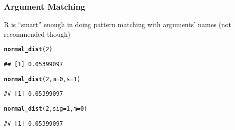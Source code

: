 \documentclass[12pt]{beamer}\usepackage[]{graphicx}\usepackage[]{color}
\makeatletter
\newcommand{\hlnum}[1]{\textcolor[rgb]{0.686,0.059,0.569}{#1}}%
\newcommand{\hlstd}[1]{\textcolor[rgb]{0.345,0.345,0.345}{#1}}%
\newcommand{\hlkwc}[1]{\textcolor[rgb]{0.333,0.667,0.333}{#1}}%
\newcommand{\hlkwd}[1]{\textcolor[rgb]{0.737,0.353,0.396}{\textbf{#1}}}%
\newenvironment{kframe}{%
 \def\at@end@of@kframe{}%
 \ifinner\ifhmode%
  \def\at@end@of@kframe{\end{minipage}}%
  \begin{minipage}{\columnwidth}%
 \fi\fi%
 \def\FrameCommand##1{\hskip\@totalleftmargin \hskip-\fboxsep
 \colorbox{shadecolor}{##1}\hskip-\fboxsep
     \hskip-\linewidth \hskip-\@totalleftmargin \hskip\columnwidth}%
 \MakeFramed {\advance\hsize-\width
   \@totalleftmargin\z@ \linewidth\hsize
   \@setminipage}}%
 {\par\unskip\endMakeFramed%
 \at@end@of@kframe}
\newenvironment{knitrout}{}{} %
\makeatother
\begin{document}

\begin{frame}[fragile]
\frametitle{Argument Matching}

R is ``smart'' enough in doing pattern matching with arguments' names (not recommended though)
\begin{knitrout}\footnotesize
{}\color{fgcolor}\begin{kframe}
\begin{alltt}
\hlkwd{normal_dist}\hlstd{(}\hlnum{2}\hlstd{)}
\end{alltt}
\begin{verbatim}
## [1] 0.05399097
\end{verbatim}
\begin{alltt}
\hlkwd{normal_dist}\hlstd{(}\hlnum{2}\hlstd{,} \hlkwc{m} \hlstd{=} \hlnum{0}\hlstd{,} \hlkwc{s} \hlstd{=} \hlnum{1}\hlstd{)}
\end{alltt}
\begin{verbatim}
## [1] 0.05399097
\end{verbatim}
\begin{alltt}
\hlkwd{normal_dist}\hlstd{(}\hlnum{2}\hlstd{,} \hlkwc{sig} \hlstd{=} \hlnum{1}\hlstd{,} \hlkwc{m} \hlstd{=} \hlnum{0}\hlstd{)}
\end{alltt}
\begin{verbatim}
## [1] 0.05399097
\end{verbatim}
\end{kframe}
\end{knitrout}

\end{frame}

\end{document}
